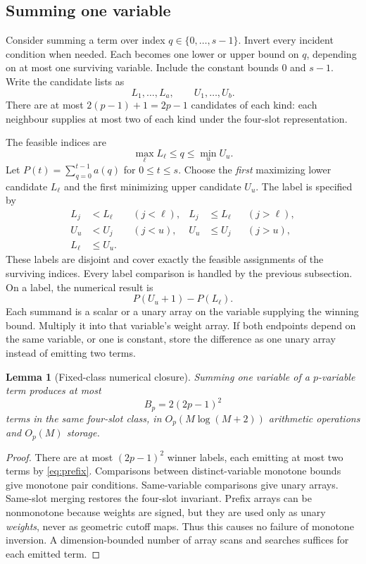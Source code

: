 \documentclass[12pt,a4paper]{article}
\newtheorem{lemma}[theorem]{Lemma}
\theoremstyle{remark}
\newcommand{\1}{\mathbf1}
\begin{document}
\subsection{Summing one variable}
Consider summing a term over index $q\in\{0,\ldots,s-1\}$.
Invert every incident condition when needed. Each becomes one lower or
upper bound on $q$, depending on at most one surviving variable.
Include the constant bounds $0$ and $s-1$. Write the candidate lists as
\[
    L_1,\ldots,L_a,\qquad U_1,\ldots,U_b.
\]
There are at most $2(p-1)+1=2p-1$ candidates of each kind: each neighbour
supplies at most two of each kind under the four-slot representation.

The feasible indices are
\[
             \max_\ell L_\ell\le q\le\min_u U_u.
\]
Let $P(t)=\sum_{q=0}^{t-1}a(q)$ for $0\le t\le s$.
Choose the \emph{first} maximizing lower candidate $L_\ell$ and the first
minimizing upper candidate $U_u$. The label is specified by
\begin{align*}
 L_j&<L_\ell &&(j<\ell),& L_j&\le L_\ell &&(j>\ell),\\
 U_u&<U_j &&(j<u),& U_u&\le U_j &&(j>u),\\
 L_\ell&\le U_u.&&&&&
\end{align*}
These labels are disjoint and cover exactly the feasible assignments of
the surviving indices. Every label comparison is handled by the previous
subsection. On a label, the numerical result is
\begin{equation}
                    P(U_u+1)-P(L_\ell).             \label{eq:prefix}
\end{equation}
Each summand is a scalar or a unary array on the variable supplying the
winning bound. Multiply it into that variable's weight array. If both
endpoints depend on the same variable, or one is constant, store the
difference as one unary array instead of emitting two terms.

\begin{lemma}[Fixed-class numerical closure]\label{lem:closure}
Summing one variable of a $p$-variable term produces at most
\[
                      B_p=2(2p-1)^2
\]
terms in the same four-slot class, in
$O_p(M\log(M+2))$ arithmetic operations and $O_p(M)$ storage.
\end{lemma}
\begin{proof}
There are at most $(2p-1)^2$ winner labels, each emitting at most two
terms by \eqref{eq:prefix}. Comparisons between distinct-variable
monotone bounds give monotone pair conditions. Same-variable comparisons
give unary arrays. Same-slot merging restores the four-slot invariant.
Prefix arrays can be nonmonotone because weights are signed, but they
are used only as unary \emph{weights}, never as geometric cutoff maps.
Thus this causes no failure of monotone inversion. A dimension-bounded
number of array scans and searches suffices for each emitted term.
\end{proof}
\end{document}
